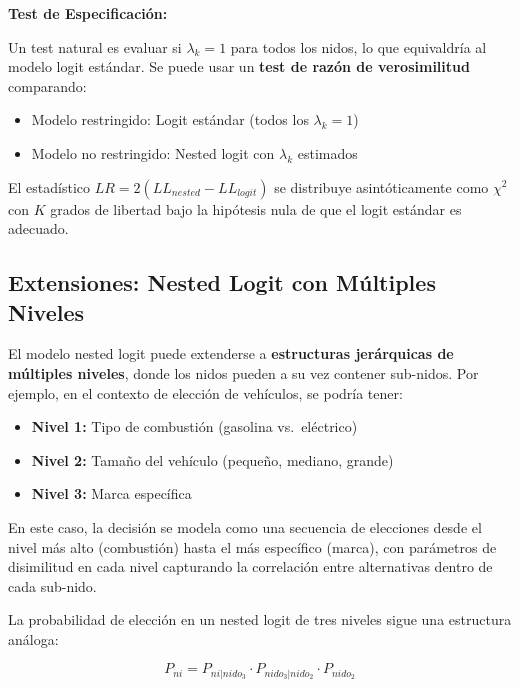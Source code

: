 \documentclass[
]{book}
\providecommand{\tightlist}{%
  \setlength{\itemsep}{0pt}\setlength{\parskip}{0pt}}
\begin{document}
\textbf{Test de Especificación:}

Un test natural es evaluar si \(\lambda_k = 1\) para todos los nidos, lo que equivaldría al modelo logit estándar. Se puede usar un \textbf{test de razón de verosimilitud} comparando:

\begin{itemize}
\tightlist
\item
  Modelo restringido: Logit estándar (todos los \(\lambda_k = 1\))
\item
  Modelo no restringido: Nested logit con \(\lambda_k\) estimados
\end{itemize}

El estadístico \(LR = 2(LL_{nested} - LL_{logit})\) se distribuye asintóticamente como \(\chi^2\) con \(K\) grados de libertad bajo la hipótesis nula de que el logit estándar es adecuado.

\subsection{Extensiones: Nested Logit con Múltiples Niveles}\label{extensiones-nested-logit-con-muxfaltiples-niveles}

El modelo nested logit puede extenderse a \textbf{estructuras jerárquicas de múltiples niveles}, donde los nidos pueden a su vez contener sub-nidos. Por ejemplo, en el contexto de elección de vehículos, se podría tener:

\begin{itemize}
\tightlist
\item
  \textbf{Nivel 1:} Tipo de combustión (gasolina vs.~eléctrico)
\item
  \textbf{Nivel 2:} Tamaño del vehículo (pequeño, mediano, grande)
\item
  \textbf{Nivel 3:} Marca específica
\end{itemize}

En este caso, la decisión se modela como una secuencia de elecciones desde el nivel más alto (combustión) hasta el más específico (marca), con parámetros de disimilitud en cada nivel capturando la correlación entre alternativas dentro de cada sub-nido.

La probabilidad de elección en un nested logit de tres niveles sigue una estructura análoga:

\begin{equation}
P_{ni} = P_{ni|nido_3} \cdot P_{nido_3|nido_2} \cdot P_{nido_2}
\label{eq:threelevel}
\end{equation}
\end{document}
